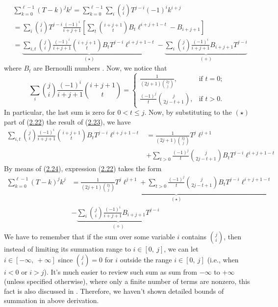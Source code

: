 \documentclass[11pt, letterpaper]{amsart} da da ya qq
\theoremstyle{definition}
\theoremstyle{remark}
\numberwithin{equation}{section}
\begin{document}
\begin{equation}\label{gen_5}
\begin{split}
&\sum_{k=0}^{\ell-1} (T-k)^j k^j =\sum_{k=0}^{\ell-1} \sum_{i} \binom{j}i T^{j-i} (-1)^i k^{i+j}\\
&=\sum_{i} \binom{j}{i} T^{j-i} \frac{(-1)^i}{i+j+1} \left[ \sum_{t} \binom{i+j+1}t B_t \ell^{i+j+1-t} - B_{i+j+1}\right] \\
&=\underbrace{\sum_{i,t}\binom{j}{i} \frac{(-1)^i}{i+j+1} \binom{i+j+1}t B_tT^{j-i}\ell^{i+j+1-t}}_{(\star)}
- \underbrace{\sum_{i} \binom{j}{i}  \frac{(-1)^i}{i+j+1} B_{i+j+1} T^{j-i}}_{(\diamond)}
\end{split}
\end{equation}
where $B_t$ are Bernoulli numbers \cite{14}. Now, we notice that
\begin{equation}\label{gen_6}
\sum_{i} \binom{j}{i} \frac{(-1)^i}{i+j+1} \binom{i+j+1}t
=\begin{cases}
\frac{1}{(2j+1)\binom{2j}j}, & \text{if } t=0;\\
\frac{(-1)^j}{t}\binom{j}{2j-t+1}, & \text{if } t>0.
\end{cases}
\end{equation}
In particular, the last sum is zero for $0<t\leq j$. Now, by substituting to the $(\star)$ part of
(\hyperref[gen_5]{2.22}) the result of (\hyperref[gen_6]{2.23}), we have
\begin{equation}\label{gen_6_1_2}
\begin{split}
\sum_{i,t}\binom{j}{i} \frac{(-1)^i}{i+j+1} \binom{i+j+1}{t} B_tT^{j-i}\ell^{i+j+1-t}
&= \frac{1}{(2j+1)\binom{2j}j}T^{j}\ell^{j+1}\\
&+\sum_{t>0} \frac{(-1)^j}{t}\binom{j}{2j-t+1} B_t T^{j-i}\ell^{i+j+1-t}
\end{split}
\end{equation}
By means of (\hyperref[gen_6_1_2]{2.24}), expression (\hyperref[gen_5]{2.22}) takes the form
\begin{equation}\label{gen_6_1}
\begin{split}
\sum_{k=0}^{\ell-1} (T-k)^j k^j
&=\underbrace{\frac{1}{(2j+1)\binom{2j}j}T^{j}\ell^{j+1}+\sum_{t>0}\frac{(-1)^j}{t}\binom{j}{2j-t+1} B_t T^{j-i}\ell^{i+j+1-t}}_{(\star)} \\
&- \underbrace{\sum_{i} \binom{j}{i}  \frac{(-1)^i}{i+j+1} B_{i+j+1} T^{j-i}}_{(\diamond)}
\end{split}
\end{equation}
We have to remember that if the sum over some variable $i$ contains $\binom{j}{i}$, then instead of limiting its summation range to $i\in[0, \ j]$, we can let $i\in[-\infty, \ +\infty]$ since $\binom{j}{i} = 0$ for $i$ outside the range $i\in[0, \ j]$ (i.e., when $i<0$ or $i>j$). It's much easier to review such sum as sum from $-\infty$ to $+\infty$ (unless specified otherwise), where only a finite number of terms are nonzero, this fact is also discussed in \cite{12}. Therefore, we haven't shown detailed bounds of summation in above derivation.
\end{document}
